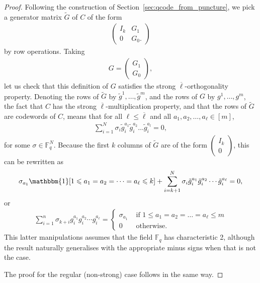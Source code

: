 \documentclass[11pt]{article}
\theoremstyle{definition}
\renewcommand{\le}{\leqslant}
\renewcommand{\leq}{\leqslant}
\newcommand*{\ol}{\overline}
\begin{document}
\begin{proof}
    Following the construction of Section~\ref{sec:qcode_from_puncture}, we pick a generator matrix $\tilde{G}$ of $C$ of the form
    \begin{align}
    \begin{pmatrix}
        I_k & G_1 \\
        0 & G_0.
    \end{pmatrix}
    \end{align}
    by row operations. Taking
    \begin{align}
        G = \begin{pmatrix}
            G_1 \\ 
            G_0
        \end{pmatrix},
    \end{align}
    let us check that this definition of $G$ satisfies the strong $\ol\ell$-orthogonality property. Denoting the rows of $\tilde{G}$ by $\tilde{g}^1, \dots, \tilde{g}^m$, and the rows of $G$ by $g^1, \dots, g^m$, the fact that $C$ has the strong $\ol{\ell}$-multiplication property, and that the rows of $\tilde{G}$ are codewords of $C$, means that for all $\ell \leq \ol{\ell}$ and all $a_1, a_2, \dots, a_\ell \in [m]$,
    \begin{align}
        \sum_{i=1}^N\sigma_i\tilde{g}_i^{a_1}\tilde{g}_i^{a_2}\ldots\tilde{g}_i^{a_l} = 0,
    \end{align}
    for some $\sigma \in \mathbb{F}_q^N$.
    Because the first $k$ columns of $\tilde{G}$ are of the form $\begin{pmatrix} I_k \\ 0 \end{pmatrix}$, this can be rewritten as
    \begin{align}
        \sigma_{a_1}\mathbbm{1}[1 \le a_1 = a_2 = \dots = a_\ell \le k] + \sum_{i = k+1}^{N}\sigma_i\tilde{g}^{a_1}_i \tilde{g}^{a_2}_i\cdots \tilde{g}^{a_\ell}_i  = 0,
    \end{align}
    or
    \begin{align}
        \sum_{i = 1}^{n} \sigma_{k+i}{g}^{a_1}_i {g}^{a_2}_i\cdots {g}^{a_\ell}_i = \begin{cases}
            \sigma_{a_1} & \text{ if $1 \le a_1 = a_2 = \dots = a_\ell \le m$} \\
            0 & \text{ otherwise}.
        \end{cases}
    \end{align}
    This latter manipulations assumes that the field $\mathbb{F}_q$ has characteristic 2, although the result naturally generalises with the appropriate minus signs when that is not the case.

    The proof for the regular (non-strong) case follows in the same way.
\end{proof}
\end{document}
